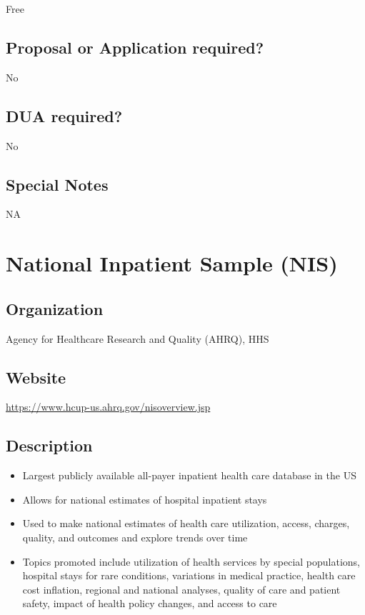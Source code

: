 \documentclass[
]{book}
\providecommand{\tightlist}{%
  \setlength{\itemsep}{0pt}\setlength{\parskip}{0pt}}
\begin{document}
Free

\hypertarget{proposal-or-application-required-53}{%
\section{Proposal or Application required?}\label{proposal-or-application-required-53}}

No

\hypertarget{dua-required-53}{%
\section{DUA required?}\label{dua-required-53}}

No

\hypertarget{special-notes-53}{%
\section{Special Notes}\label{special-notes-53}}

NA

\mainmatter

\hypertarget{national-inpatient-sample-nis}{%
\chapter{National Inpatient Sample (NIS)}\label{national-inpatient-sample-nis}}

\hypertarget{organization-54}{%
\section{Organization}\label{organization-54}}

Agency for Healthcare Research and Quality (AHRQ), HHS

\hypertarget{website-54}{%
\section{Website}\label{website-54}}

\url{https://www.hcup-us.ahrq.gov/nisoverview.jsp}

\hypertarget{description-54}{%
\section{Description}\label{description-54}}

\begin{itemize}
\tightlist
\item
  Largest publicly available all-payer inpatient health care database in the US
\item
  Allows for national estimates of hospital inpatient stays
\item
  Used to make national estimates of health care utilization, access, charges, quality, and outcomes and explore trends over time
\item
  Topics promoted include utilization of health services by special populations, hospital stays for rare conditions, variations in medical practice, health care cost inflation, regional and national analyses, quality of care and patient safety, impact of health policy changes, and access to care
\end{itemize}
\end{document}
